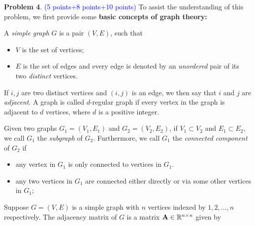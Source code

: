 \documentclass[english,onecolumn]{IEEEtran}
\newcommand{\Rbb}{\mathbb{R}}
\newcommand{\bA}{{\bf A}}
\begin{document}
\newpage
\noindent\textbf{Problem 4}. \textcolor{blue}{(5 points+8 points+10 points)}
\noindent To assist the understanding of this problem, we first provide some \textbf{basic concepts of graph theory:}
 
 A \textit{simple graph} $G$ is a pair $(V,E)$, such that
\begin{itemize}
	\item 
	$V$ is the set of vertices;
	
	\item 
	$E$ is the set of edges and every edge is denoted by an \textit{unordered} pair of its two \textit{distinct} vertices.
\end{itemize}


 If $i,j$ are two distinct vertices and $(i,j)$ is an edge, we then say that $i$ and $j$ are \textit{adjacent}. A graph is called $d$-regular graph if every vertex in the graph is adjacent to $d$ vertices, where $d$ is a positive integer.

 Given two graphs $G_1=(V_1,E_1)$ and $G_2=(V_2,E_2)$, if $V_1\subset V_2$ and $E_1\subset E_2$, we call $G_1$ the \textit{subgraph} of $G_2$. 
Furthermore,  we call $G_1$ the \textit{connected component} of $G_2$ 
if 
\begin{itemize}
    \item 
	any vertex in $G_1$ is only connected to vertices in $G_1$.
	\item 
	any two vertices in $G_1$ are connected either directly or via some other vertices in $G_1$;
\end{itemize}
\vspace{3mm}
\noindent 
Suppose $G=(V,E)$ is a simple graph with $n$ vertices indexed by $1,2,...,n$ respectively. 
The adjacency matrix of $G$ is a matrix $\bA\in \Rbb^{n\times n}$ given by
\end{document}
